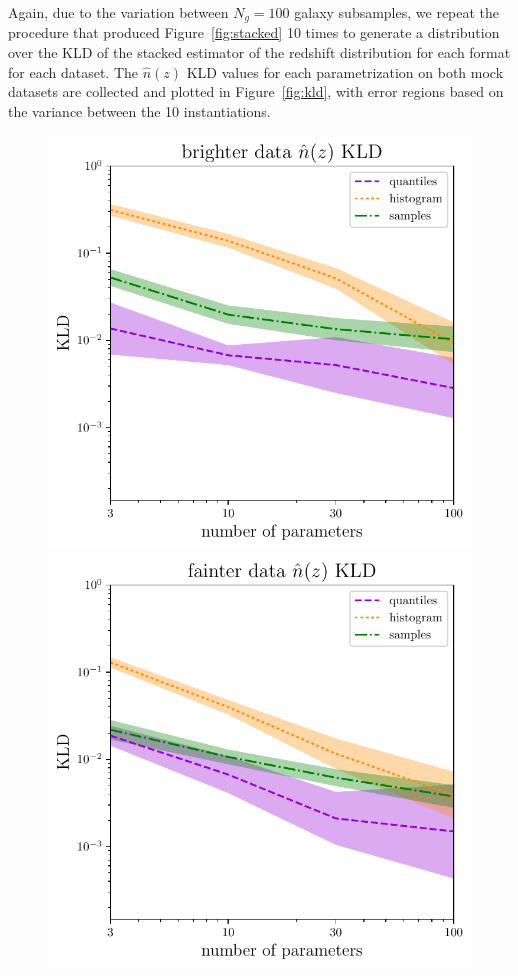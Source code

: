 \documentclass[\docopts]{\docclass}
\begin{document}
Again, due to the variation between $N_{g}=100$ galaxy subsamples, we repeat 
the procedure that produced Figure~\ref{fig:stacked} 10 times to generate a 
distribution over the KLD of the stacked estimator of the redshift distribution 
for each format for each dataset.
The $\hat{n}(z)$ KLD values for each parametrization on both mock datasets are 
collected and plotted in Figure~\ref{fig:kld}, with error regions based on the 
variance between the 10 instantiations.
\begin{figure}
  \begin{center}
    \includegraphics[width=\columnwidth]{figures/graham_nz_kld.pdf}    
\includegraphics[width=\columnwidth]{figures/schmidt_nz_kld.pdf}

\end{center}
\end{figure}
\end{document}
